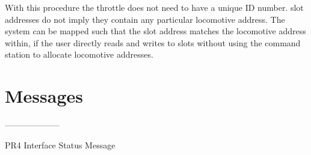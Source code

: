 With this procedure the throttle does not need to have a unique ID number. slot addresses do not imply they contain any particular locomotive address. The system can be mapped such that the slot address matches the locomotive address within, if the user directly reads and writes to slots without using the command station to allocate locomotive addresses.

\section{Messages}















































--------------------

PR4 Interface Status Message

